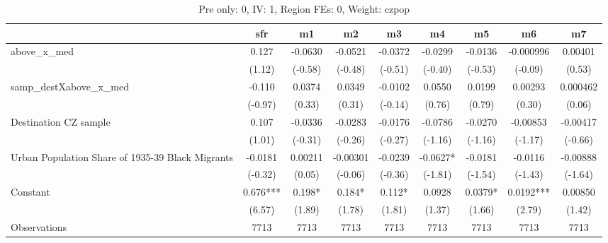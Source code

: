 \begin{table}[htbp]\centering
\def\sym#1{\ifmmode^{#1}\else\(^{#1}\)\fi}
\caption{Pre only: 0, IV: 1, Region FEs: 0, Weight: czpop}
\begin{tabular}{l*{8}{c}}
\toprule
                    &\multicolumn{1}{c}{sfr}&\multicolumn{1}{c}{m1}&\multicolumn{1}{c}{m2}&\multicolumn{1}{c}{m3}&\multicolumn{1}{c}{m4}&\multicolumn{1}{c}{m5}&\multicolumn{1}{c}{m6}&\multicolumn{1}{c}{m7}\\
\midrule
above\_x\_med         &       0.127   &     -0.0630   &     -0.0521   &     -0.0372   &     -0.0299   &     -0.0136   &   -0.000996   &     0.00401   \\
                    &      (1.12)   &     (-0.58)   &     (-0.48)   &     (-0.51)   &     (-0.40)   &     (-0.53)   &     (-0.09)   &      (0.53)   \\
\addlinespace
samp\_destXabove\_x\_med&      -0.110   &      0.0374   &      0.0349   &     -0.0102   &      0.0550   &      0.0199   &     0.00293   &    0.000462   \\
                    &     (-0.97)   &      (0.33)   &      (0.31)   &     (-0.14)   &      (0.76)   &      (0.79)   &      (0.30)   &      (0.06)   \\
\addlinespace
Destination CZ sample&       0.107   &     -0.0336   &     -0.0283   &     -0.0176   &     -0.0786   &     -0.0270   &    -0.00853   &    -0.00417   \\
                    &      (1.01)   &     (-0.31)   &     (-0.26)   &     (-0.27)   &     (-1.16)   &     (-1.16)   &     (-1.17)   &     (-0.66)   \\
\addlinespace
Urban Population Share of 1935-39 Black Migrants&     -0.0181   &     0.00211   &    -0.00301   &     -0.0239   &     -0.0627*  &     -0.0181   &     -0.0116   &    -0.00888   \\
                    &     (-0.32)   &      (0.05)   &     (-0.06)   &     (-0.36)   &     (-1.81)   &     (-1.54)   &     (-1.43)   &     (-1.64)   \\
\addlinespace
Constant            &       0.676***&       0.198*  &       0.184*  &       0.112*  &      0.0928   &      0.0379*  &      0.0192***&     0.00850   \\
                    &      (6.57)   &      (1.89)   &      (1.78)   &      (1.81)   &      (1.37)   &      (1.66)   &      (2.79)   &      (1.42)   \\
\midrule
Observations        &        7713   &        7713   &        7713   &        7713   &        7713   &        7713   &        7713   &        7713   \\

\end{tabular}
\end{table}
